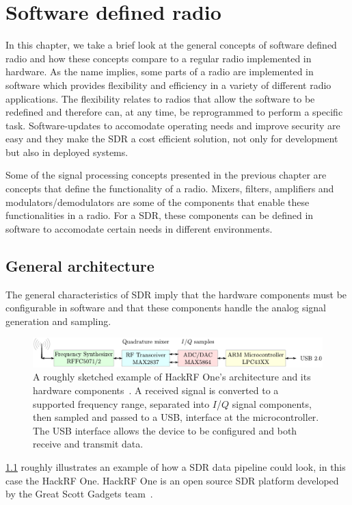 \chapter{Software defined radio}
In this chapter, we take a brief look at the general concepts of
software defined radio and how these concepts compare to a regular
radio implemented in hardware. As the name implies, some parts of a
radio are implemented in software which provides flexibility and
efficiency in a variety of different radio applications. The
flexibility relates to radios that allow the software to be redefined
and therefore can, at any time, be reprogrammed to perform a specific
task. Software-updates to accomodate operating needs and improve
security are easy and they make the \gls{SDR} a cost efficient
solution, not only for development but also in deployed systems.

Some of the signal processing concepts presented in the previous
chapter are concepts that define the functionality of a radio. Mixers,
filters, amplifiers and modulators/demodulators are some of the
components that enable these functionalities in a radio. For a
\gls{SDR}, these components can be defined in software to accomodate
certain needs in different environments.

\section{General architecture}
The general characteristics of \gls{SDR} imply that the hardware
components must be configurable in software and that these components
handle the analog signal generation and sampling.

\begin{figure}[H]
  \centering
  \includegraphics[width=.9\textwidth]{figures/sdr_hackrf_block_diagram}
  \caption{A roughly sketched example of HackRF One's architecture and
    its hardware components~\cite{hackrf_diagram}. A received signal
    is converted to a supported frequency range, separated into
    $I$/$Q$ signal components, then sampled and passed to a \gls{USB},
    interface at the microcontroller. The \gls{USB} interface allows the
    device to be configured and both receive and transmit data.}
  \label{fig:hackrf_block_diagram}
\end{figure}

\cref{fig:hackrf_block_diagram} roughly illustrates an example of how
a \gls{SDR} data pipeline could look, in this case the HackRF One. HackRF
One is an open source \gls{SDR} platform developed by the Great Scott
Gadgets team~\cite{gsg}.


